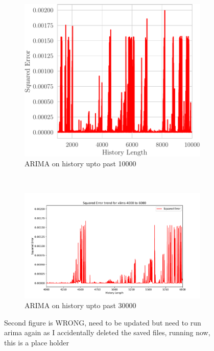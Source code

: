 \begin{figure}[h]
    \centering
    \begin{subfigure}[h]{0.5\textwidth}
        \centering
        \includegraphics[scale=0.55]{figures/SE_trend_arima_10000.pdf}
        \caption{ARIMA on history upto past 10000}
    \end{subfigure}%
    ~ 
    \begin{subfigure}[h]{0.5\textwidth}
        \centering
        \includegraphics[scale=0.4]{figures/SE_trend_arima_30000.pdf}
        \caption{ARIMA on history upto past 30000}
    \end{subfigure}
    \caption{Second figure is WRONG, need to be updated but need to run arima again as I accidentally deleted the saved files, running now, this is a place holder}
    \label{fig:arima}
\end{figure}

